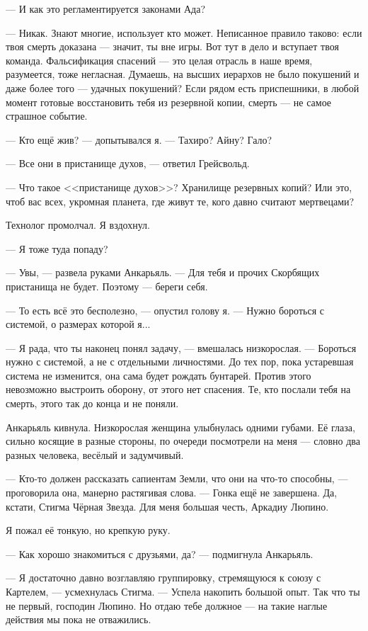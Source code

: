 --- И как это регламентируется законами Ада?

--- Никак.
Знают многие, использует кто может.
Неписанное правило таково: если твоя смерть доказана --- значит, ты вне игры.
Вот тут в дело и вступает твоя команда.
Фальсификация спасений --- это целая отрасль в наше время, разумеется, тоже негласная.
Думаешь, на высших иерархов не было покушений и даже более того --- удачных покушений?
Если рядом есть приспешники, в любой момент готовые восстановить тебя из резервной копии, смерть --- не самое страшное событие.

--- Кто ещё жив? --- допытывался я.
--- Тахиро? Айну? Гало?

--- Все они в пристанище духов, --- ответил Грейсвольд.

--- Что такое <<пристанище духов>>?
Хранилище резервных копий?
Или это, чтоб вас всех, укромная планета, где живут те, кого давно считают мертвецами?

Технолог промолчал.
Я вздохнул.

--- Я тоже туда попаду?

--- Увы, --- развела руками Анкарьяль.
--- Для тебя и прочих Скорбящих пристанища не будет.
Поэтому --- береги себя.

--- То есть всё это бесполезно, --- опустил голову я.
--- Нужно бороться с системой, о размерах которой я...

--- Я рада, что ты наконец понял задачу, --- вмешалась низкорослая.
--- Бороться нужно с системой, а не с отдельными личностями.
До тех пор, пока устаревшая система не изменится, она сама будет рождать бунтарей.
Против этого невозможно выстроить оборону, от этого нет спасения.
Те, кто послали тебя на смерть, этого так до конца и не поняли.

Анкарьяль кивнула.
Низкорослая женщина улыбнулась одними губами.
Её глаза, сильно косящие в разные стороны, по очереди посмотрели на меня --- словно два разных человека, весёлый и задумчивый.

--- Кто-то должен рассказать сапиентам Земли, что они на что-то способны, --- проговорила она, манерно растягивая слова.
--- Гонка ещё не завершена.
Да, кстати, Стигма Чёрная Звезда.
Для меня большая честь, Аркадиу Люпино.

Я пожал её тонкую, но крепкую руку.

--- Как хорошо знакомиться с друзьями, да? --- подмигнула Анкарьяль.

--- Я достаточно давно возглавляю группировку, стремящуюся к союзу с Картелем, --- усмехнулась Стигма.
--- Успела накопить большой опыт.
Так что ты не первый, господин Люпино.
Но отдаю тебе должное --- на такие наглые действия мы пока не отважились.


